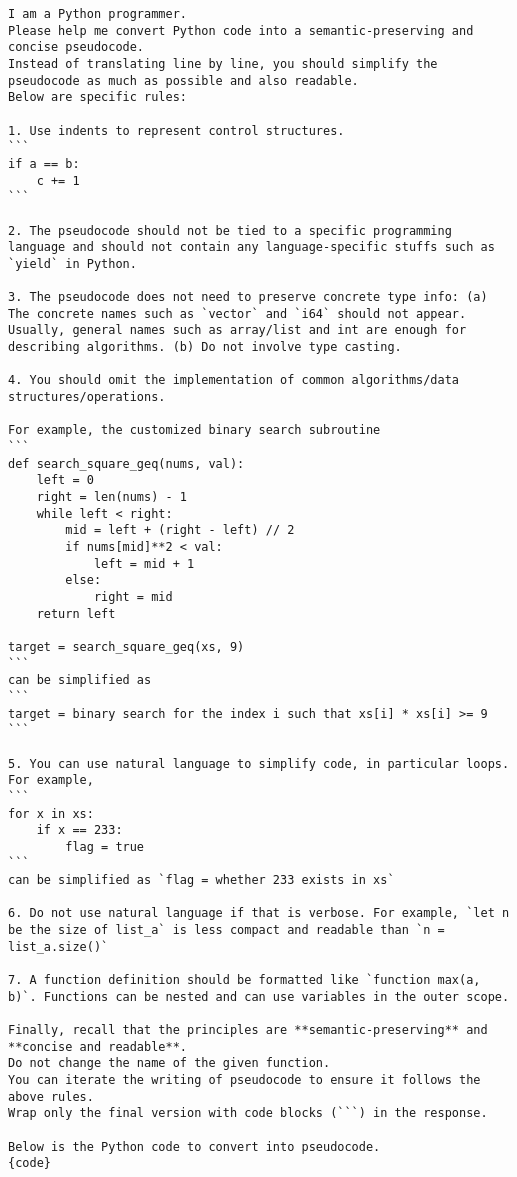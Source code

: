 \begin{figure*}
\centering
\footnotesize
\begin{lstlisting}
I am a Python programmer.
Please help me convert Python code into a semantic-preserving and concise pseudocode.
Instead of translating line by line, you should simplify the pseudocode as much as possible and also readable.
Below are specific rules:

1. Use indents to represent control structures.
```
if a == b:
    c += 1
```

2. The pseudocode should not be tied to a specific programming language and should not contain any language-specific stuffs such as `yield` in Python.

3. The pseudocode does not need to preserve concrete type info: (a) The concrete names such as `vector` and `i64` should not appear. Usually, general names such as array/list and int are enough for describing algorithms. (b) Do not involve type casting.

4. You should omit the implementation of common algorithms/data structures/operations.

For example, the customized binary search subroutine
```
def search_square_geq(nums, val):
    left = 0
    right = len(nums) - 1
    while left < right:
        mid = left + (right - left) // 2
        if nums[mid]**2 < val:
            left = mid + 1
        else:
            right = mid
    return left
    
target = search_square_geq(xs, 9)
```
can be simplified as
```
target = binary search for the index i such that xs[i] * xs[i] >= 9
```

5. You can use natural language to simplify code, in particular loops. For example,
```
for x in xs:
    if x == 233:
        flag = true
```
can be simplified as `flag = whether 233 exists in xs`

6. Do not use natural language if that is verbose. For example, `let n be the size of list_a` is less compact and readable than `n = list_a.size()`

7. A function definition should be formatted like `function max(a, b)`. Functions can be nested and can use variables in the outer scope.

Finally, recall that the principles are **semantic-preserving** and **concise and readable**.
Do not change the name of the given function.
You can iterate the writing of pseudocode to ensure it follows the above rules.
Wrap only the final version with code blocks (```) in the response.

Below is the Python code to convert into pseudocode.
{code}
\end{lstlisting}
\label{lst:pseudogen-prompt}
\end{figure*}
